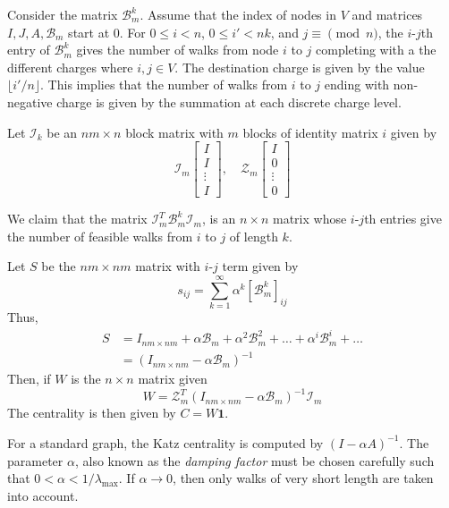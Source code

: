 \documentclass[envcountsame]{llncs}
\begin{document}
Consider the matrix $\mathcal{B}_m^k$. Assume that the index of nodes in $V$ and matrices $I,J,A, \mathcal{B}_m$ start at 0. For $0 \leq i < n$, $0 \leq i' < nk$,  and $j \equiv \pmod{n}$, the $i$-$j$th entry of $\mathcal{B}_m^k$ gives the number of walks from node $i$ to $j$  completing with a the different charges where $i,j\in V$. The destination charge is given by the value $\lfloor i'/n \rfloor$. This implies that the number of walks from $i$ to $j$ ending with non-negative charge is given by the summation at each discrete charge level. 

Let $\mathcal{I}_k$ be an $nm \times n$ block matrix with $m$ blocks of identity matrix $i$ given by
\begin{equation*}
\mathcal{I}_m
\begin{bmatrix}
I \\
I \\
\vdots \\
I
\end{bmatrix}, \quad
\mathcal{Z}_m
\begin{bmatrix}
I \\
0 \\
\vdots \\
0
\end{bmatrix}
\end{equation*}

We claim that the matrix  $\mathcal{I}_m^T\mathcal{B}_m^k\mathcal{I}_m$, is an $n\times n$ matrix whose $i$-$j$th entries give the number of feasible walks from $i$ to $j$ of length $k$. 

Let $S$ be the $nm \times nm$ matrix with $i$-$j$ term given by
\begin{equation*}
s_{ij} = \sum_{k=1}^{\infty}\alpha^k[\mathcal{B}_m^k]_{ij}
\end{equation*}
Thus,
\begin{align*}
S &= I_{nm \times nm} + \alpha \mathcal{B}_m + \alpha^2 \mathcal{B}_m^2 + \dots +  \alpha^i \mathcal{B}_m^i + \dots \\
&= (I_{nm \times nm} - \alpha \mathcal{B}_m )^{-1}
\end{align*}
Then, if $W$ is the $n \times n$ matrix given
\begin{equation*}
W =  \mathcal{Z}_m^T(I_{nm \times nm} - \alpha \mathcal{B}_m )^{-1}\mathcal{I}_m
\end{equation*}
The centrality is then given by $C = W \textbf{1}$.

For a standard graph, the Katz centrality is computed by $(I - \alpha A)^{-1}$. The parameter $\alpha$, also known as the \emph{damping factor} must be chosen carefully such that $0 < \alpha < 1/\lambda_{\max}$. If $\alpha \to 0$, then only walks of very short length are taken into account. 
\end{document}
